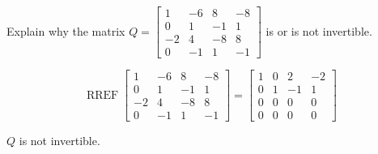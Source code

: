 
\begin{exerciseStatement}


Explain why the matrix \(Q= \left[\begin{array}{cccc}
1 & -6 & 8 & -8 \\
0 & 1 & -1 & 1 \\
-2 & 4 & -8 & 8 \\
0 & -1 & 1 & -1
\end{array}\right] \) is or is not invertible.


\end{exerciseStatement}
    
\begin{exerciseAnswer} 


\[\operatorname{RREF} \left[\begin{array}{cccc}
1 & -6 & 8 & -8 \\
0 & 1 & -1 & 1 \\
-2 & 4 & -8 & 8 \\
0 & -1 & 1 & -1
\end{array}\right] = \left[\begin{array}{cccc}
1 & 0 & 2 & -2 \\
0 & 1 & -1 & 1 \\
0 & 0 & 0 & 0 \\
0 & 0 & 0 & 0
\end{array}\right] \]

\(Q\) is not invertible.
\end{exerciseAnswer}
    
